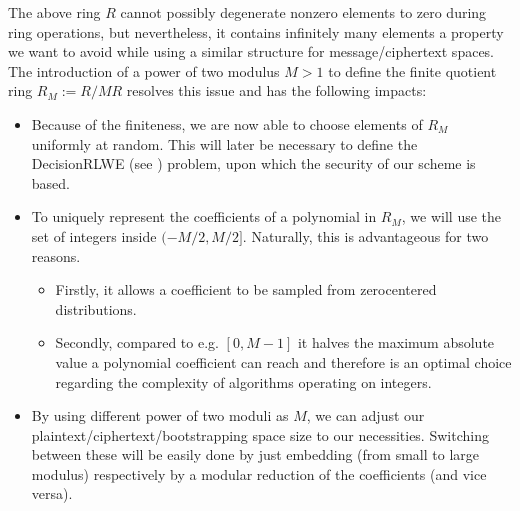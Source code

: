 \documentclass[letterpaper,10pt,english]{jupyterBook}
\begin{document}
\begin{DUlineblock}{0em}
\item[] 
\end{DUlineblock}

\sphinxAtStartPar
The above ring \(R\) cannot possibly degenerate nonzero elements to zero during ring operations, but nevertheless, it contains infinitely many elements \sphinxhyphen{} a property we want to avoid while using a similar structure for message/ciphertext spaces.
The introduction of a power of two modulus \(M > 1\) to define the finite quotient ring \(R_M := R/MR\) resolves this issue and has the following impacts:
\begin{itemize}
\item {} 
\sphinxAtStartPar
Because of the finiteness, we are now able to choose elements of \(R_M\) uniformly at random.
This will later be necessary to define the Decision\sphinxhyphen{}RLWE (see {\hyperref[\detokenize{Thesis:decision-RLWE}]{}}) problem, upon which the security of our scheme is based.

\item {} 
\sphinxAtStartPar
To uniquely represent the coefficients of a polynomial in \(R_M\), we will use the set of integers inside \((-M/2,M/2]\).
Naturally, this is advantageous for two reasons.
\begin{itemize}
\item {} 
\sphinxAtStartPar
Firstly, it allows a coefficient to be sampled from zero\sphinxhyphen{}centered distributions.

\item {} 
\sphinxAtStartPar
Secondly, compared to e.g. \([0,M-1]\) it halves the maximum absolute value a polynomial coefficient can reach and therefore is an optimal choice regarding the complexity of algorithms operating on integers.

\end{itemize}

\item {} 
\sphinxAtStartPar
By using different power of two moduli as \(M\), we can adjust our plaintext/ciphertext/bootstrapping space size to our necessities.
Switching between these will be easily done by just embedding (from small to large modulus) respectively by a modular reduction of the coefficients (and vice versa).

\end{itemize}
\end{document}
